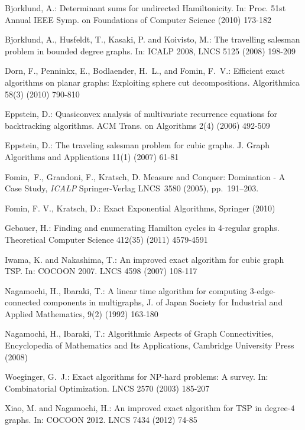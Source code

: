 \documentclass[runningheads]{llncs}
\begin{document}
\begin{thebibliography}{99}


Bjorklund, A.:
\newblock Determinant sums for undirected Hamiltonicity.
\newblock In: Proc. 51st Annual IEEE Symp. on Foundations of Computer Science (2010)  173-182

Bjorklund, A., Husfeldt, T., Kasaki, P. and Koivisto, M.:
\newblock The travelling salesman problem in bounded degree graphs.
\newblock In: ICALP 2008, LNCS 5125 (2008) 198-209


Dorn, F., Penninkx, E., Bodlaender, H.~L., and Fomin, F.~V.:
\newblock Efficient exact algorithms on planar graphs: Exploiting sphere cut decompositions.
\newblock Algorithmica  58(3) (2010)  790-810

Eppstein, D.:
Quasiconvex analysis of multivariate recurrence equations
for backtracking algorithms.
ACM Trans. on Algorithms  2(4) (2006) 492-509

Eppstein, D.:
\newblock The traveling salesman problem for cubic graphs.
\newblock J. Graph Algorithms and Applications 11(1) (2007)  61-81

Fomin,~F., Grandoni, F., Kratsch, D.
Measure and Conquer: Domination - A Case Study,
{\em ICALP\/} Springer-Verlag LNCS~3580 (2005),
pp.~191--203.

Fomin, F. V.,  Kratsch, D.:
Exact Exponential Algorithms, Springer (2010)

Gebauer, H.:
\newblock Finding and enumerating Hamilton cycles in 4-regular graphs.
\newblock Theoretical Computer Science  412(35) (2011)  4579-4591

Iwama, K. and Nakashima, T.:
\newblock An improved exact algorithm for cubic graph TSP.
\newblock In: COCOON 2007.
LNCS  4598
(2007) 108-117


 Nagamochi, H., Ibaraki, T.:
A linear time algorithm for computing 3-edge-connected
 components in multigraphs,
 { J. of Japan Society for Industrial and Applied Mathematics},
 9(2) (1992) 163-180

 Nagamochi, H., Ibaraki, T.:
 Algorithmic Aspects of Graph Connectivities, Encyclopedia of Mathematics and Its Applications, Cambridge University Press (2008)

Woeginger, G.~J.:
\newblock  Exact algorithms for NP-hard problems: A survey.
\newblock In: Combinatorial Optimization. LNCS 2570 (2003)  185-207


  Xiao, M. and  Nagamochi, H.:
\newblock  An improved exact algorithm for TSP in degree-$4$ graphs.
\newblock In: COCOON 2012.
LNCS 7434 (2012) 74-85

\end{thebibliography}
\end{document}
